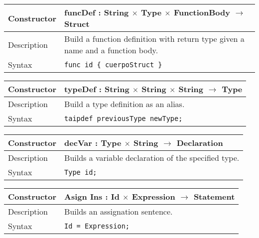 \documentclass[10pt,a4paper]{article}
\begin{document}
\begin{center}
    \begin{tabular}[h]{|p{}|p{}|}
        \hline
        Constructor & funcDef : String $\times$ Type $\times$ FunctionBody $\rightarrow$ Struct \\
        \hline
        Description & Build a function definition with return type given a name and a function body. \\
        \hline
        Syntax & \texttt{func id \{ cuerpoStruct \}} \\
        \hline
    \end{tabular}
\end{center}

\begin{center}
    \begin{tabular}[h]{|p{}|p{}|}
        \hline
        Constructor & typeDef : String $\times$ String $\times$ String $\rightarrow$ Type \\
        \hline
        Description & Build a type definition as an alias. \\
        \hline
        Syntax & \texttt{taipdef previousType newType;} \\
        \hline
    \end{tabular}
\end{center}

\begin{center}
    \begin{tabular}[h]{|p{}|p{}|}
        \hline
        Constructor & decVar : Type $\times$ String $\rightarrow$ Declaration \\
        \hline
        Description & Builds a variable declaration of the specified type. \\
        \hline
        Syntax & \texttt{Type id;} \\
        \hline
    \end{tabular}
\end{center}

\begin{center}
    \begin{tabular}[h]{|p{}|p{}|}
        \hline
        Constructor & Asign Ins : Id $\times$ Expression $\rightarrow$ Statement \\
        \hline
        Description & Builds an assignation sentence. \\
        \hline
        Syntax & \texttt{Id = Expression;} \\
        \hline
    \end{tabular}
\end{center}
\end{document}

